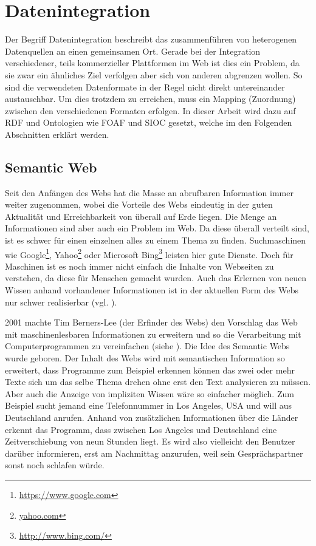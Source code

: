 

\section{Datenintegration} %
\label{sec:datenintegration}

Der Begriff Datenintegration beschreibt das zusammenführen von heterogenen Datenquellen an einen gemeinsamen Ort. Gerade bei der Integration verschiedener, teils kommerzieller Plattformen im Web ist dies ein Problem, da sie zwar ein ähnliches Ziel verfolgen aber sich von anderen abgrenzen wollen. So sind die verwendeten Datenformate in der Regel nicht direkt untereinander austauschbar. Um dies trotzdem zu erreichen, muss ein Mapping (Zuordnung) zwischen den verschiedenen Formaten erfolgen. In dieser Arbeit wird dazu auf RDF und Ontologien wie FOAF und SIOC gesetzt, welche im den Folgenden Abschnitten erklärt werden.

\subsection{Semantic Web} %
\label{sub:semantic_web}

Seit den Anfängen des Webs hat die Masse an abrufbaren Information immer weiter zugenommen, wobei die Vorteile des Webs eindeutig in der guten Aktualität und Erreichbarkeit von überall auf Erde liegen. Die Menge an Informationen sind aber auch ein Problem im Web. Da diese überall verteilt sind, ist es schwer für einen einzelnen alles zu einem Thema zu finden. Suchmaschinen wie Google\footnote{\url{https://www.google.com}}, Yahoo\footnote{\url{yahoo.com}} oder Microsoft Bing\footnote{\url{http://www.bing.com/}} leisten hier gute Dienste. Doch für Maschinen ist es noch immer nicht einfach die Inhalte von Webseiten zu verstehen, da diese für Menschen gemacht wurden. Auch das Erlernen von neuen Wissen anhand vorhandener Informationen ist in der aktuellen Form des Webs nur schwer realisierbar (vgl. \cite{Hitzler2008a}). 

2001 machte Tim Berners-Lee (der Erfinder des Webs) den Vorschlag das Web mit maschinenlesbaren Informationen zu erweitern und so die Verarbeitung mit Computerprogrammen zu vereinfachen (siehe \cite{Berners-Lee2001}). Die Idee des Semantic Webs wurde geboren. Der Inhalt des Webs wird mit semantischen Information so erweitert, dass Programme zum Beispiel erkennen können das zwei oder mehr Texte sich um das selbe Thema drehen ohne erst den Text analysieren zu müssen. Aber auch die Anzeige von impliziten Wissen wäre so einfacher möglich. Zum Beispiel sucht jemand eine Telefonnummer in Los Angeles, USA und will aus Deutschland anrufen. Anhand von zusätzlichen Informationen über die Länder erkennt das Programm, dass zwischen Los Angeles und Deutschland eine Zeitverschiebung von neun Stunden liegt. Es wird also vielleicht den Benutzer darüber informieren, erst am Nachmittag anzurufen, weil sein Gesprächspartner sonst noch schlafen würde.

